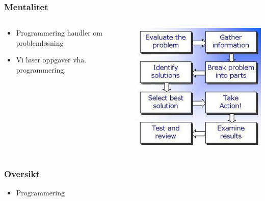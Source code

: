 \documentclass[screen, aspectratio=169]{beamer}
\begin{document}
\begin{frame}
	\frametitle{Mentalitet}
	\begin{columns}
		\begin{column}{.4\textwidth}
			\begin{itemize}
				\item Programmering handler om problemløsning
				\item Vi løser oppgaver vha. programmering.
			\end{itemize}
		\end{column}
		\hfill
		\begin{column}{.4\textwidth}
			\includegraphics[width=\textwidth]{programmering}
		\end{column}
	\end{columns}
\end{frame}

\begin{frame}
	\frametitle{Oversikt}
	\begin{itemize}
		\item Programmering
	\end{itemize}
\end{frame}
\end{document}
